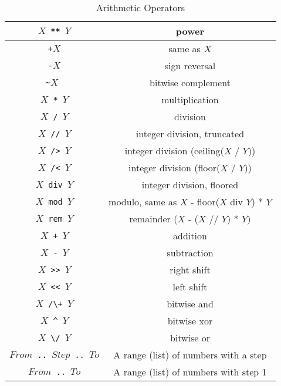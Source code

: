 \begin{table}
\caption{\label{tab:arithdef}Arithmetic Operators}
\begin{center}
\begin{tabular}{ |c|c| } \hline
 \texttt{$X$ ** $Y$}  &  power \\ \hline 
 \texttt{+$X$}      &  same as $X$ \\ \hline
 \texttt{-$X$}      &  sign reversal \\ \hline 
 {\tt \verb+~+$X$ }  &   bitwise complement \\ \hline 
 \texttt{$X$ * $Y$} &    multiplication \\ \hline 
 \texttt{$X$ / $Y$} &    division \\ \hline 
 \texttt{$X$ // $Y$} &    integer division, truncated \\ \hline 
 \texttt{$X$ /> $Y$}  &  integer division (ceiling($X$ / $Y$)) \\ \hline
 \texttt{$X$ /< $Y$}  &  integer division (floor($X$ / $Y$)) \\ \hline
 \texttt{$X$ div $Y$} &   integer division, floored \\ \hline
 \texttt{$X$ mod $Y$} &   modulo, same as $X$ - floor($X$ div $Y$) * $Y$ \\ \hline 
 \texttt{$X$ rem $Y$} &  remainder ($X$ - ($X$ // $Y$) * $Y$) \\ \hline 
 \texttt{$X$ + $Y$} & addition \\ \hline 
 \texttt{$X$ - $Y$} &   subtraction \\ \hline 
 \texttt{$X$ >> $Y$}  &  right shift \\ \hline 
 \texttt{$X$ << $Y$}  &  left shift \\ \hline 
 {\tt $X$ \verb+/\+ $Y$}  &   bitwise and \\ \hline 
 {\tt $X$ \verb+^+ $Y$} &   bitwise xor \\ \hline
 {\tt $X$ \verb+\/+ $Y$}  &   bitwise or \\ \hline 
 {\tt $From$ \verb+..+ $Step$ \verb+..+ $To$}  &   A range (list) of numbers with a step \\ \hline 
 {\tt $From$ \verb+..+ $To$}  &   A range (list) of numbers with step 1 \\ \hline 
\end{tabular}
\end{center}
\end{table}


